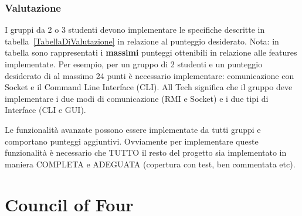 \documentclass{beamer}
\begin{document}
\begin{frame}
\frametitle{Valutazione}
I gruppi da 2 o 3 studenti devono implementare  le specifiche
descritte in tabella~\ref{TabellaDiValutazione} in relazione al
punteggio desiderato. Nota: in tabella sono rappresentati i
\textbf{massimi} punteggi ottenibili in relazione alle features
implementate. Per esempio, per un gruppo di 2 studenti e un punteggio
desiderato di al massimo 24 punti \`e necessario implementare:
comunicazione con Socket e il Command Line Interface (CLI).
All Tech significa che il gruppo deve implementare i due modi di
comunicazione (RMI e Socket) e i due tipi di Interface (CLI e GUI).

Le funzionalit\`a avanzate possono essere implementate da tutti gruppi e comportano punteggi aggiuntivi. Ovviamente per implementare queste funzionalit\`a \`e necessario che TUTTO il resto del progetto sia implementato in maniera COMPLETA e ADEGUATA (copertura con test, ben commentata etc).
\end{frame}



{
%
\section{Council of Four}
\begin{frame}[plain]



\end{frame}
}
\end{document}
